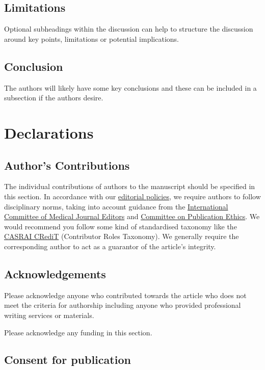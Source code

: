 \documentclass[a4paper,num-refs]{ehi-journals}
\begin{document}
\subsection{Limitations}

Optional subheadings within the discussion can help to structure the discussion around key points, limitations or potential implications.

\subsection{Conclusion}

The authors will likely have some key conclusions and these can be included in a subsection if the authors desire.

\section{Declarations}

\subsection{Author's Contributions}

The individual contributions of authors to the manuscript should be specified in this section. In accordance with our \href{https://about.epistemehealth.com/policy/}{editorial policies}, we require authors to follow disciplinary norms, taking into account guidance from the \href{http://www.icmje.org/}{International Committee of Medical Journal Editors} and \href{https://publicationethics.org/resources/discussion-documents/what-constitutes-authorship-english-june-2014}{Committee on Publication Ethics}. We would recommend you follow some kind of standardised taxonomy like the \href{http://docs.casrai.org/CRediT}{CASRAI CRediT} (Contributor Roles Taxonomy). We generally require the corresponding author to act as a guarantor of the article's integrity.

\subsection{Acknowledgements}

Please acknowledge anyone who contributed towards the article who does not meet the criteria for authorship including anyone who provided professional writing services or materials.

Please acknowledge any funding in this section.

\subsection{Consent for publication}
\end{document}
